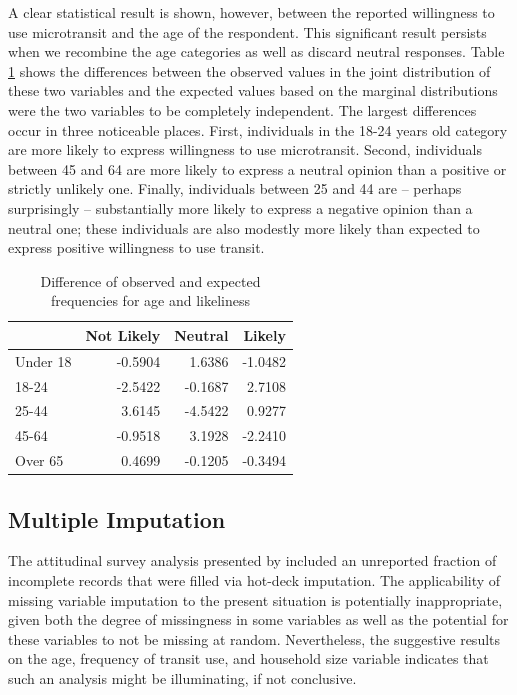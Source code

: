 \documentclass[smartcities,article,submit,moreauthors,pdftex]{Definitions/mdpi}
\begin{document}
A clear statistical result is shown, however, between the reported willingness to use microtransit and the age of the respondent. This significant result persists when we recombine the age categories as well as discard neutral responses. Table \ref{tab:age-difference} shows the differences between the observed values in the joint distribution of these two variables and the expected values based on the marginal distributions were the two variables to be completely independent. The largest differences occur in three noticeable places. First, individuals in the 18-24 years old category are more likely to express willingness to use microtransit. Second, individuals between 45 and 64 are more likely to express a neutral opinion than a positive or strictly unlikely one. Finally, individuals between 25 and 44 are -- perhaps surprisingly -- substantially more likely to express a negative opinion than a neutral one; these individuals are also modestly more likely than expected to express positive willingness to use transit.

\begin{table}[ht]
    \centering
    \caption{Difference of observed and expected frequencies for age and likeliness}
    \label{tab:age-difference}
\begin{tabular}[t]{lrrr}
\toprule
  & Not Likely & Neutral & Likely\\
\midrule
Under 18 & -0.5904 & 1.6386 & -1.0482\\
18-24 & -2.5422 & -0.1687 & 2.7108\\
25-44 & 3.6145 & -4.5422 & 0.9277\\
45-64 & -0.9518 & 3.1928 & -2.2410\\
Over 65 & 0.4699 & -0.1205 & -0.3494\\
\bottomrule
\end{tabular}
\end{table}

\subsection{Multiple Imputation}
The attitudinal survey analysis presented by \citet{KONIG2020954} included an unreported fraction of incomplete records that were filled via hot-deck imputation. The applicability of missing variable imputation to the present situation is potentially inappropriate, given both the degree of missingness in some variables as well as the potential for these variables to not be missing at random. Nevertheless, the suggestive results on the age, frequency of transit use, and household size variable indicates that such an analysis might be illuminating, if not conclusive.
\end{document}
